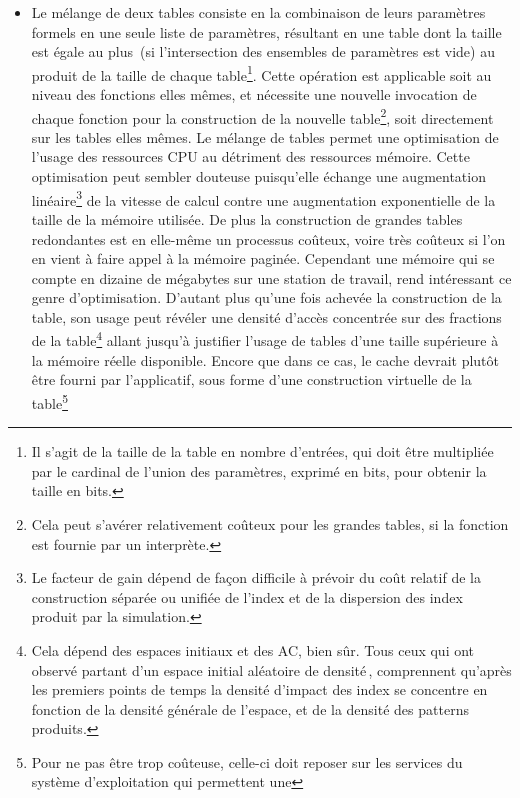 \begin{itemize}
\item%
  Le mélange de deux tables consiste en la combinaison de leurs
  paramètres formels en une seule liste de paramètres, résultant en
  une table dont la taille est égale au plus~(si l'intersection des
  ensembles de paramètres est vide) au produit de la taille de chaque
  table\footnote{%
    Il s'agit de la taille de la table en nombre d'entrées, qui doit
    être multipliée par le cardinal de l'union des paramètres,
    exprimé en bits, pour obtenir la taille en bits.}. %
  Cette opération est applicable soit au niveau des fonctions elles
  mêmes, et nécessite une nouvelle invocation de chaque fonction
  pour la construction de la nouvelle table\footnote{%
    Cela peut s'avérer relativement coûteux pour les grandes tables,
    si la fonction est fournie par un interprète.}, %
  soit directement sur les tables elles mêmes. %
  Le mélange de tables permet une optimisation de l'usage des
  ressources CPU au détriment des ressources mémoire. %
  Cette optimisation peut sembler douteuse puisqu'elle échange une
  augmentation linéaire\footnote{%
    Le facteur de gain dépend de façon difficile à prévoir du coût
    relatif de la construction séparée ou unifiée de l'index et de la
    dispersion des index produit par la simulation.} %
  de la vitesse de calcul contre une augmentation exponentielle de la
  taille de la mémoire utilisée. %
  De plus la construction de grandes tables redondantes est en
  elle-même un processus coûteux, voire très coûteux si l'on en vient
  à faire appel à la mémoire paginée. %
  Cependant une mémoire qui se compte en dizaine de mégabytes sur une
  station de travail, rend intéressant ce genre d'optimisation. %
  D'autant plus qu'une fois achevée la construction de la table,
  son usage peut révéler une densité d'accès concentrée sur des
  fractions de la table\footnote{%
    Cela dépend des espaces initiaux et des AC, bien sûr. %
    Tous ceux qui ont observé  partant d'un espace
    initial aléatoire de densité\,\protect\Fundemi,
    comprennent qu'après les premiers points de temps
    la densité d'impact des index se concentre en fonction de la
    densité générale de l'espace,
    et de la densité des patterns produits.} %
  allant jusqu'à justifier l'usage de tables d'une taille
  supérieure à la mémoire réelle disponible. %
  Encore que dans ce cas, le cache devrait plutôt être fourni par
  l'applicatif, sous forme d'une construction virtuelle de la
  table\footnote{%
    Pour ne pas être trop coûteuse, celle-ci doit reposer sur les
    services du système d'exploitation qui permettent une
}
\end{itemize}
